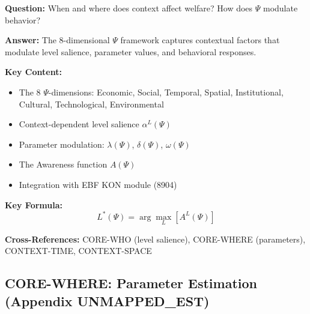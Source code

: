 \begin{tcolorbox}[colback=gray!5!white, colframe=gray!75!black]
\textbf{Question:} When and where does context affect welfare? How does $\Psi$ modulate behavior?

\textbf{Answer:} The 8-dimensional $\Psi$ framework captures contextual factors 
that modulate level salience, parameter values, and behavioral responses.

\textbf{Key Content:}
\begin{itemize}[nosep]
\item The 8 $\Psi$-dimensions: Economic, Social, Temporal, Spatial, Institutional, Cultural, Technological, Environmental
\item Context-dependent level salience $\alpha^L(\Psi)$
\item Parameter modulation: $\lambda(\Psi)$, $\delta(\Psi)$, $\omega(\Psi)$
\item The Awareness function $A(\Psi)$
\item Integration with EBF KON module (8904)
\end{itemize}

\textbf{Key Formula:}
\begin{equation}
L^*(\Psi) = \arg\max_L \left[ A^L(\Psi) \right]
\end{equation}

\textbf{Cross-References:} CORE-WHO (level salience), CORE-WHERE (parameters), CONTEXT-TIME, CONTEXT-SPACE
\end{tcolorbox}

\subsection{CORE-WHERE: Parameter Estimation (Appendix UNMAPPED_EST)}

